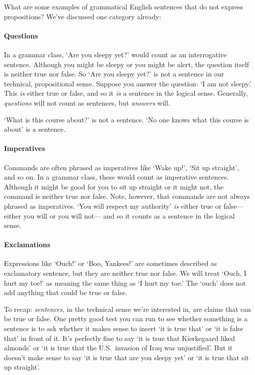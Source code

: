 What are some examples of grammatical English sentences that do not express propositions? We've discussed one category already:

\paragraph{Questions} In a grammar class, `Are you sleepy yet?' would count as an interrogative sentence. Although you might be sleepy or you might be alert, the question itself is neither true nor false. So `Are you sleepy yet?' is not a sentence in our technical, propositional sense. Suppose you answer the question: `I am not sleepy.' This \emph{is} either true or false, and so it \emph{is} a sentence in the logical sense. Generally, \emph{questions} will not count as sentences, but \emph{answers} will. 

`What is this course about?' is not a sentence. `No one knows what this course is about' is a sentence.

\paragraph{Imperatives} Commands are often phrased as imperatives like `Wake up!', `Sit up straight', and so on. In a grammar class, these would count as imperative sentences. Although it might be good for you to sit up straight or it might not, the command is neither true nor false. Note, however, that commands are not always phrased as imperatives. `You will respect my authority' \emph{is} either true or false--- either you will or you will not--- and so it counts as a sentence in the logical sense.

\paragraph{Exclamations} Expressions like `Ouch!' or `Boo, Yankees!' are sometimes described as exclamatory sentence, but they are neither true nor false. We will treat `Ouch, I hurt my toe!' as meaning the same thing as `I hurt my toe.' The `ouch' does not add anything that could be true or false.

To recap: \emph{sentences}, in the technical sense we're interested in, are claims that can be true or false. One pretty good test you can run to see whether something is a sentence is to ask whether it makes sense to insert `it is true that' or `it is false that' in front of it. It's perfectly fine to say `it is true that Kierkegaard liked almonds' or `it is true that the U.S.\ invasion of Iraq was unjustified'. But it doesn't make sense to say `it is true that are you sleepy yet' or `it is true that sit up straight'.

